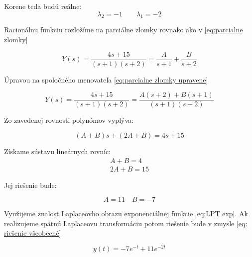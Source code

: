 \documentclass[a4paper,10pt]{article}
\begin{document}
Korene teda budú reálne:
\begin{equation*}
	\lambda_2=-1 \qquad \lambda_1=-2
\end{equation*}


Racionálnu funkciu rozložíme na parciálne zlomky rovnako ako v \eqref{eq:parcialne zlomky}

\begin{equation*}
Y(s)=\frac{4s+15}{(s+1)(s+2)}=\frac{A}{s+1}+\frac{B}{s+2}
\end{equation*}

Úpravou na spoločného menovateľa \eqref{eq:parcialne zlomky upravene}

\begin{equation*}
Y(s)=\frac{4s+15}{(s+1)(s+2)}=\frac{A(s+2)+B(s+1)}{(s+1)(s+2)}
\end{equation*}

Zo zavedenej rovnosti polynómov vyplýva:

\begin{equation*}
(A+B)s+(2A+B)=4s+15
\end{equation*}

Získame sústavu lineárnych rovníc:
\begin{equation*}
\begin{array}{c}
	A+B=4 \\
	2A+B=15
\end{array}
\end{equation*}

Jej riešenie bude:

\begin{equation*}
A=11 \quad B=-7
\end{equation*}

Využijeme znalosť Laplaceovho obrazu exponenciálnej funkcie \eqref{eq:LPT exp}.
Ak realizujeme spätnú Laplaceovu transformáciu potom riešenie bude v zmysle \eqref{eq: riešenie všeobecné}

\begin{equation*}
y(t)=-7e^{-t}+11e^{-2t}
\end{equation*}
\end{document}
